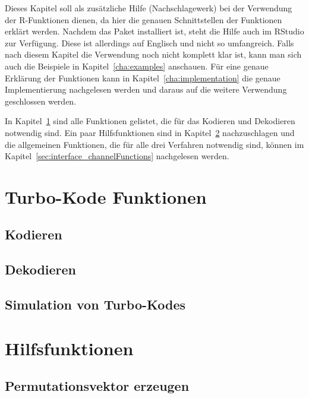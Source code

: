 Dieses Kapitel soll als zusätzliche Hilfe (Nachschlagewerk) bei der Verwendung der R-Funktionen dienen, da hier die genauen Schnittstellen der Funktionen erklärt werden. Nachdem das Paket installiert ist, steht die Hilfe auch im RStudio zur Verfügung. Diese ist allerdings auf Englisch und nicht so umfangreich. Falls nach diesem Kapitel die Verwendung noch nicht komplett klar ist, kann man sich auch die Beispiele in Kapitel~\ref{cha:examples} anschauen. Für eine genaue Erklärung der Funktionen kann in Kapitel~\ref{cha:implementation} die genaue Implementierung nachgelesen werden und daraus auf die weitere Verwendung geschlossen werden.

In Kapitel~\ref{sec:interface_turboFunctions} sind alle Funktionen gelistet, die für das Kodieren und Dekodieren notwendig sind. Ein paar Hilfsfunktionen sind in Kapitel~\ref{sec:interface_helperFunctions} nachzuschlagen und die allgemeinen Funktionen, die für alle drei Verfahren notwendig sind, können im Kapitel~\ref{sec:interface_channelFunctions} nachgelesen werden. 
\newpage

\section{Turbo-Kode Funktionen}
\label{sec:interface_turboFunctions}

\subsection{Kodieren}
\label{sec:interface_encode}


\subsection{Dekodieren}
\label{sec:interface_decode}

\newpage

\subsection{Simulation von Turbo-Kodes}
\label{sec:interface_simulation}


\section{Hilfsfunktionen}
\label{sec:interface_helperFunctions}

\subsection{Permutationsvektor erzeugen}
\label{sec:interface_permutation}


